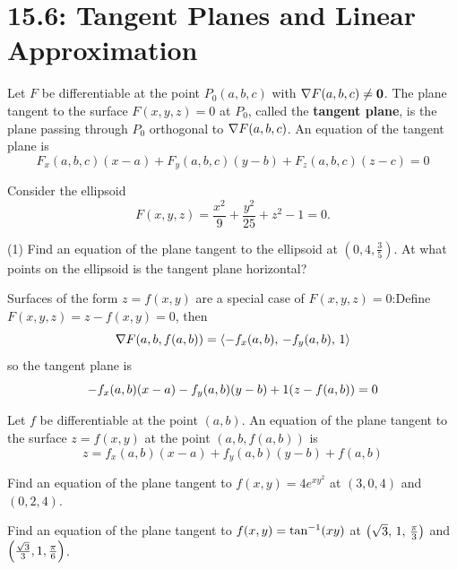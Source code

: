 \documentclass[mathNotesPreamble]{subfiles}
\begin{document}
\section{15.6: Tangent Planes and Linear Approximation}

  \begin{defn*}[Equation of the Tangent Plane for $F(x,y,z)=0$]
    Let $F$ be differentiable at the point $P_0(a,b,c)$ with $\nabla F(a,b,c)\neq \mathbf{0}$. The plane tangent to the surface $F(x,y,z)=0$ at $P_0$, called the \textbf{tangent plane}, is the plane passing through $P_0$ orthogonal to $\nabla F(a,b,c)$. An equation of the tangent plane is
      \[F_x(a,b,c)(x-a)+F_y(a,b,c)(y-b)+F_z(a,b,c)(z-c)=0\]
  \end{defn*}

  \begin{ex*}
    Consider the ellipsoid 
      \[F(x,y,z)= \frac{x^2}{9}+\frac{y^2}{25}+z^2-1=0.\]
    \begin{tasks}[after-item-skip=\stretch{1}](1)
      \task Find an equation of the plane tangent to the ellipsoid at $(0,4, \frac{3}{5})$.
      \task At what points on the ellipsoid is the tangent plane horizontal?
    \end{tasks}
  \end{ex*}
  \pagebreak

  \noindent
  Surfaces of the form $z=f(x,y)$ are a special case of $F(x,y,z)=0$:\newline Define $F(x,y,z)=z-f(x,y)=0$, then
    \[\nabla F{\left(a,b,f(a,b)\right)}={\left\langle -f_x(a,b),\,-f_y(a,b),\,1 \right\rangle}\]
  so the tangent plane is
    \[-f_x(a,b)(x-a)-f_y(a,b)(y-b)+1{\left(z-f(a,b)\right)}=0\]
  \begin{thmBox*}[Tangent Plane for $z=f(x,y)$]
    Let $f$ be differentiable at the point $(a,b)$. An equation of the plane tangent to the surface $z=f(x,y)$ at the point $(a,b,f(a,b))$ is
      \[z=f_x(a,b)(x-a)+f_y(a,b)(y-b)+f(a,b)\]
  \end{thmBox*}

  \begin{ex*}
    Find an equation of the plane tangent to $f(x,y)=4e^{xy^2}$ at $(3,0,4)$ and $(0,2,4)$.
  \end{ex*}
  \pagebreak

  \begin{ex*}
    Find an equation of the plane tangent to $f(x,y)=\tan^{-1}(xy)$ at ${\left(\sqrt{3},\,1,\,\frac{\pi}{3}\right)}$ and ${\left(\frac{\sqrt{3}}{3},1,\frac{\pi}{6}\right)}$.
  \end{ex*}
\end{document}
